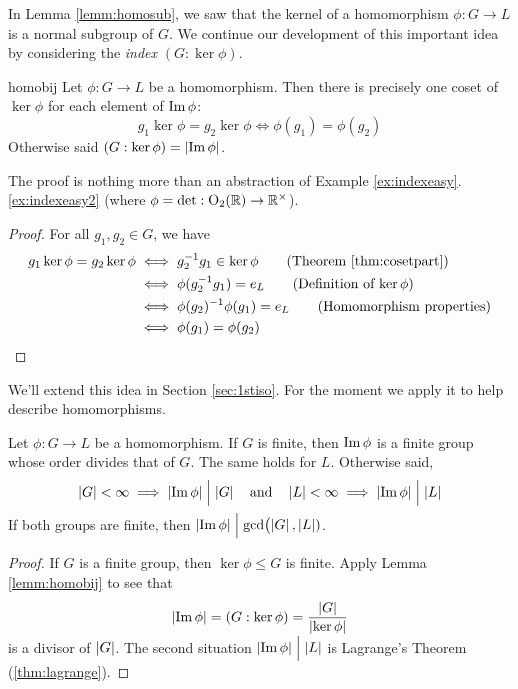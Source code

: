 In Lemma \ref{lemm:homosub}, we saw that the kernel of a homomorphism $\phi:G\to L$ is a normal subgroup of $G$. We continue our development of this important idea by considering the \emph{index} $(G:\ker\phi)$.

\begin{lemm}{}{homobij}
	Let $\phi:G\to L$ be a homomorphism. Then there is precisely one coset of $\ker\phi$ for each element of $\operatorname{Im}\phi$:
	\[
		g_1\ker\phi=g_2\ker\phi
		\iff \phi(g_1)=\phi(g_2)
	\]
	Otherwise said $(G:\ker\phi)=\left| \operatorname{Im}\phi\right|$.
\end{lemm}

The proof is nothing more than an abstraction of Example \ref*{ex:indexeasy}.\ref{ex:indexeasy2} (where $\phi=\det:\mathrm{O}_2(\mathbb{R})\to\mathbb{R}^\times$).

\begin{proof}
	For all $g_1,g_2\in G$, we have
	\begin{align*}
		g_1\ker\phi=g_2\ker\phi&\iff g_2^{-1}g_1\in\ker\phi \tag{Theorem \ref{thm:cosetpart}}\\
		&\iff\phi(g_2^{-1}g_1)=e_L\tag{Definition of $\ker\phi$}\\
		&\iff \phi(g_2)^{-1}\phi(g_1)=e_L\tag{Homomorphism properties}\\
		&\iff \phi(g_1)=\phi(g_2)\tag*{\qedhere}
	\end{align*}
\end{proof}

We'll extend this idea in Section \ref{sec:1stiso}. For the moment we apply it to help describe homomorphisms.

\begin{thm}{}{}
	Let $\phi:G\to L$ be a homomorphism. If $G$ is finite, then $\operatorname{Im}\phi$ is a finite group whose order divides that of $G$. The same holds for $L$. Otherwise said,
	\[
		\left| G\right|<\infty
		\implies\left| \operatorname{Im}\phi\right|\Bigm| \left| G\right|
		\quad\text{and}\quad 
		\left| L\right|<\infty\implies\left| \operatorname{Im}\phi\right|\Bigm| \left| L\right|
	\]
	If both groups are finite, then $\smash[t]{\left| \operatorname{Im}\phi\right|\Bigm|\gcd\bigl(\left| G\right|,\left| L\right|)}$.
\end{thm}

\begin{proof}
	If $G$ is a finite group, then $\ker\phi\le G$ is finite. Apply Lemma \ref{lemm:homobij} to see that
	\[
		\left| \operatorname{Im}\phi\right|=(G:\ker\phi) =\smash[b]{\frac{\left| G\right|}{\left| \ker\phi\right|}}
	\]
	is a divisor of $\left| G\right|$. The second situation $\left| \operatorname{Im}\phi\right|\Bigm|\left| L\right|$ is Lagrange's Theorem (\ref{thm:lagrange}).
\end{proof}


